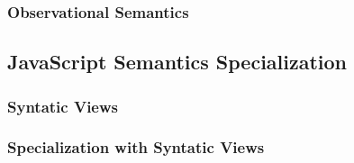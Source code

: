 \todo

\subsubsection{Observational Semantics}

\todo





\subsection{JavaScript Semantics Specialization}

\todo

\subsubsection{Syntatic Views}

\todo

\subsubsection{Specialization with Syntatic Views}

\todo
